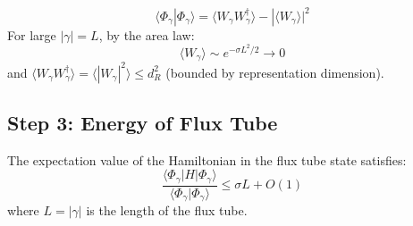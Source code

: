 \begin{lemma}[Normalization]
\begin{equation}
\langle \Phi_\gamma | \Phi_\gamma \rangle = \langle W_\gamma W_\gamma^\dagger \rangle - |\langle W_\gamma \rangle|^2
\end{equation}
For large $|\gamma| = L$, by the area law:
\begin{equation}
\langle W_\gamma \rangle \sim e^{-\sigma L^2 / 2} \to 0
\end{equation}
and $\langle W_\gamma W_\gamma^\dagger \rangle = \langle |W_\gamma|^2 \rangle \leq d_R^2$ (bounded by representation dimension).
\end{lemma}

\subsection{Step 3: Energy of Flux Tube}

\begin{theorem}
\label{thm:flux-tube-energy}
The expectation value of the Hamiltonian in the flux tube state satisfies:
\begin{equation}
\frac{\langle \Phi_\gamma | H | \Phi_\gamma \rangle}{\langle \Phi_\gamma | \Phi_\gamma \rangle} \leq \sigma L + O(1)
\end{equation}
where $L = |\gamma|$ is the length of the flux tube.
\end{theorem}

